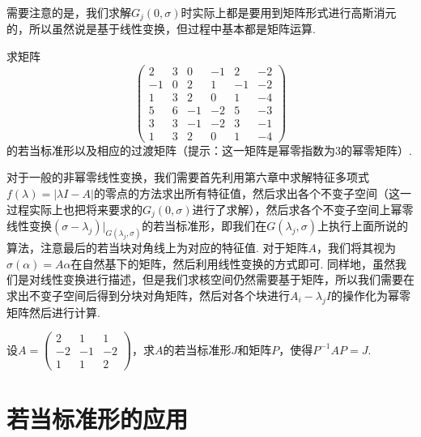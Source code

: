 需要注意的是，我们求解$G_j(0,\sigma)$时实际上都是要用到矩阵形式进行高斯消元的，所以虽然说是基于线性变换，但过程中基本都是矩阵运算.
\begin{example}
    求矩阵\[\begin{pmatrix}
            2 & 3 & 0  & -1 & 2 & -2 \\ -1 & 0 & 2 & 1 & -1 & -2 \\
            1 & 3 & 2  & 0  & 1 & -4 \\ 5 & 6 & -1 & -2 & 5 & -3 \\
            3 & 3 & -1 & -2 & 3 & -1 \\ 1 & 3 & 2 & 0 & 1 & -4
        \end{pmatrix}\]的若当标准形以及相应的过渡矩阵（提示：这一矩阵是幂零指数为3的幂零矩阵）.
\end{example}

\begin{solution}

\end{solution}

对于一般的非幂零线性变换，我们需要首先利用第六章中求解特征多项式$f(\lambda)=|\lambda I-A|$的零点的方法求出所有特征值，然后求出各个不变子空间（这一过程实际上也把将来要求的$G_j(0,\sigma)$进行了求解），然后求各个不变子空间上幂零线性变换$(\sigma-\lambda_j)\vert_{G(\lambda_j,\sigma)}$的若当标准形，即我们在$G(\lambda_j,\sigma)$上执行上面所说的算法，注意最后的若当块对角线上为对应的特征值. 对于矩阵$A$，我们将其视为$\sigma(\alpha)=A\alpha$在自然基下的矩阵，然后利用线性变换的方式即可. 同样地，虽然我们是对线性变换进行描述，但是我们求核空间仍然需要基于矩阵，所以我们需要在求出不变子空间后得到分块对角矩阵，然后对各个块进行$A_i-\lambda_jI$的操作化为幂零矩阵然后进行计算.
\begin{example}
    设$A=\begin{pmatrix}
            2 & 1 & 1 \\ -2 & -1 & -2 \\ 1 & 1 & 2
        \end{pmatrix}$，求$A$的若当标准形$J$和矩阵$P$，使得$P^{-1}AP=J$.
\end{example}

\begin{solution}

\end{solution}

\section{若当标准形的应用}
